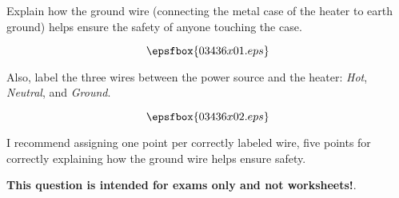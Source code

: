 

Explain how the ground wire (connecting the metal case of the heater to earth ground) helps ensure the safety of anyone touching the case. 

$$\epsfbox{03436x01.eps}$$

Also, label the three wires between the power source and the heater: {\it Hot}, {\it Neutral}, and {\it Ground}.







$$\epsfbox{03436x02.eps}$$

I recommend assigning one point per correctly labeled wire, five points for correctly explaining how the ground wire helps ensure safety.







{\bf This question is intended for exams only and not worksheets!}.



